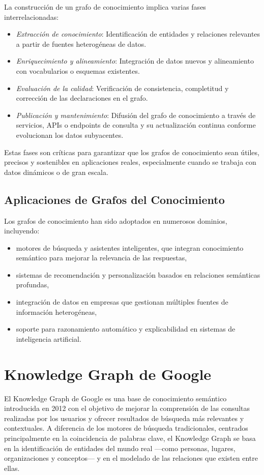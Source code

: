 \documentclass{article}
\begin{document}
La construcción de un grafo de conocimiento implica varias fases interrelacionadas:
\begin{itemize}
    \item \textit{Extracción de conocimiento}: Identificación de entidades y relaciones relevantes a partir de fuentes heterogéneas de datos.
    \item \textit{Enriquecimiento y alineamiento}: Integración de datos nuevos y alineamiento con vocabularios o esquemas existentes.
    \item \textit{Evaluación de la calidad}: Verificación de consistencia, completitud y corrección de las declaraciones en el grafo.
    \item \textit{Publicación y mantenimiento}: Difusión del grafo de conocimiento a través de servicios, APIs o endpoints de consulta y su actualización continua conforme evolucionan los datos subyacentes.
\end{itemize}
Estas fases son críticas para garantizar que los grafos de conocimiento sean útiles, precisos y sostenibles en aplicaciones reales, especialmente cuando se trabaja con datos dinámicos o de gran escala.

\subsection{Aplicaciones de Grafos del Conocimiento}

Los grafos de conocimiento han sido adoptados en numerosos dominios, incluyendo:
\begin{itemize}
\item motores de búsqueda y asistentes inteligentes, que integran conocimiento semántico para mejorar la relevancia de las respuestas,
\item sistemas de recomendación y personalización basados en relaciones semánticas profundas,
\item integración de datos en empresas que gestionan múltiples fuentes de información heterogéneas,
\item soporte para razonamiento automático y explicabilidad en sistemas de inteligencia artificial.
\end{itemize}

\section{Knowledge Graph de Google}

El Knowledge Graph de Google es una base de conocimiento semántico introducida en 2012 con el objetivo de mejorar la comprensión de las consultas realizadas por los usuarios y ofrecer resultados de búsqueda más relevantes y contextuales. A diferencia de los motores de búsqueda tradicionales, centrados principalmente en la coincidencia de palabras clave, el Knowledge Graph se basa en la identificación de entidades del mundo real —como personas, lugares, organizaciones y conceptos— y en el modelado de las relaciones que existen entre ellas.
\end{document}
